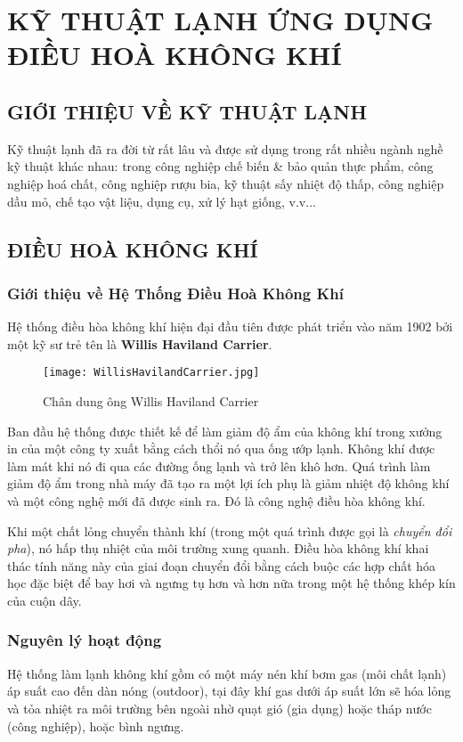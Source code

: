 
	\section{KỸ THUẬT LẠNH ỨNG DỤNG ĐIỀU HOÀ KHÔNG KHÍ}
	\subsection{GIỚI THIỆU VỀ KỸ THUẬT LẠNH}
	Kỹ thuật lạnh đã ra đời từ rất lâu và được sử dụng trong rất nhiều ngành nghề kỹ thuật khác nhau: trong công nghiệp chế biến \& bảo quản thực phẩm, công nghiệp hoá chất, công nghiệp rượu bia, kỹ thuật sấy nhiệt độ thấp, công nghiệp dầu mỏ, chế tạo vật liệu, dụng cụ, xử lý hạt giống, v.v...
	
	\subsection{ĐIỀU HOÀ KHÔNG KHÍ}
	\subsubsection{Giới thiệu về Hệ Thống Điều Hoà Không Khí}
	Hệ thống điều hòa không khí hiện đại đầu tiên được phát triển vào năm 1902 bởi một kỹ sư trẻ tên là \textbf{Willis Haviland Carrier}. 
	
	\begin{wrapfigure}{r}{0.3\textwidth}
		\texttt{[image: WillisHavilandCarrier.jpg]}
		\caption{Chân dung ông Willis Haviland Carrier}
	\end{wrapfigure}

	Ban đầu hệ thống được thiết kế để làm giảm độ ẩm của không khí trong xưởng in của một công ty xuất bằng cách thổi nó qua ống ướp lạnh. Không khí được làm mát khi nó đi qua các đường ống lạnh và trở lên khô hơn. Quá trình làm giảm độ ẩm trong nhà máy đã tạo ra một lợi ích phụ là giảm nhiệt độ không khí và một công nghệ mới đã được sinh ra. Đó là công nghệ điều hòa không khí.
	
	Khi một chất lỏng chuyển thành khí (trong một quá trình được gọi là \emph{chuyển đổi pha}), nó hấp thụ nhiệt của môi trường xung quanh. Điều hòa không khí khai thác tính năng này của giai đoạn chuyển đổi bằng cách buộc các hợp chất hóa học đặc biệt để bay hơi và ngưng tụ hơn và hơn nữa trong một hệ thống khép kín của cuộn dây.
	
	\subsubsection{Nguyên lý hoạt động}
	Hệ thống làm lạnh không khí gồm có một máy nén khí bơm gas (môi chất lạnh) áp suất cao đến dàn nóng (outdoor), tại đây khí gas dưới áp suất lớn sẽ hóa lỏng và tỏa nhiệt ra môi trường bên ngoài nhờ quạt gió (gia dụng) hoặc tháp nước (công nghiệp), hoặc bình ngưng.

